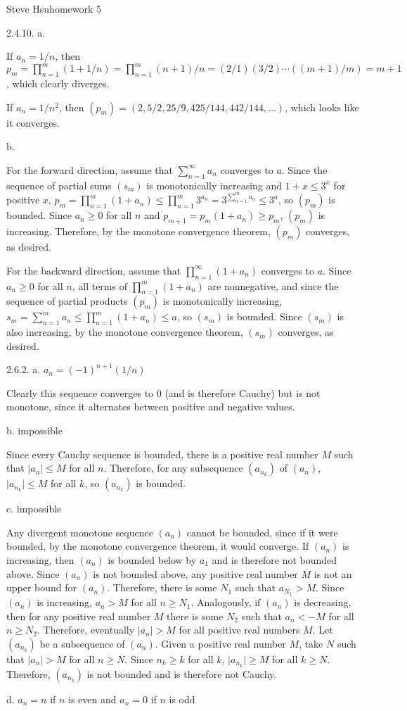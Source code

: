 \def\abs#1{\vert{#1}\vert}
\centerline{Steve Hsu\hfill homework 5}
\item{2.4.10.} a.

If $a_n = 1/n$, then
$p_m = \prod _{n=1} ^m (1 + 1/n) = \prod _{n=1} ^m (n+1)/n =
(2/1)(3/2)\cdots((m+1)/m) = m+1$, which clearly diverges.

If $a_n = 1/n^2$, then
$(p_m) = (2, 5/2, 25/9, 425/144, 442/144, \ldots)$,
which looks like it converges.
\medskip
\item{} b.

For the forward direction, assume that
$\sum _{n=1} ^\infty a_n$ converges to $a$.
Since the sequence of partial sums $(s_m)$ is monotonically increasing
and $1 + x \le 3^x$ for positive $x$,
$p_m = \prod _{n=1} ^m (1+a_n) \le \prod _{n=1} ^m 3^{a_n} =
3 ^{\sum _{n=1} ^m a_n} \le 3 ^a$, so $(p_m)$ is bounded.
Since $a_n \ge 0$ for all $n$ and $p_{m+1} = p_m (1 + a_n) \ge p_m$,
$(p_m)$ is increasing.
Therefore, by the monotone convergence theorem, $(p_m)$ converges, as desired.

For the backward direction, assume that
$\prod _{n=1} ^\infty (1+a_n)$ converges to $a$.
Since $a_n \ge 0$ for all $n$,
all terms of $\prod _{n=1} ^m (1 + a_n)$ are nonnegative,
and since the sequence of partial products $(p_m)$ is monotonically increasing,
$s_m = \sum _{n=1} ^m a_n \le \prod _{n=1} ^m (1+a_n) \le a$,
so $(s_m)$ is bounded.
Since $(s_m)$ is also increasing, by the monotone convergence theorem,
$(s_m)$ converges, as desired.
\bigskip
\item{2.6.2.} a. $a_n = (-1)^{n+1} (1/n)$

Clearly this sequence converges to $0$ (and is therefore Cauchy)
but is not monotone, since it alternates between positive and negative values.
\medskip
\item{} b. impossible

Since every Cauchy sequence is bounded,
there is a positive real number $M$ such that
$\abs{a_n} \le M$ for all $n$.
Therefore, for any subsequence $(a_{n_k})$ of $(a_n)$,
$\abs{a_{n_k}} \le M$ for all $k$, so $(a_{n_k})$ is bounded.
\medskip
\item{} c. impossible

Any divergent monotone sequence $(a_n)$ cannot be bounded, since
if it were bounded, by the monotone convergence theorem, it would converge.
If $(a_n)$ is increasing, then $(a_n)$ is bounded below by $a_1$
and is therefore not bounded above.
Since $(a_n)$ is not bounded above,
any positive real number $M$ is not an upper bound for $(a_n)$.
Therefore, there is some $N_1$ such that $a_{N_1} > M$.
Since $(a_n)$ is increasing, $a_n > M$ for all $n \ge N_1$.
Analogously, if $(a_n)$ is decreasing,
then for any positive real number $M$
there is some $N_2$ such that $a_n < -M$ for all $n \ge N_2$.
Therefore, eventually $\abs{a_n} > M$ for all positive real numbers $M$.
Let $(a_{n_k})$ be a subsequence of $(a_n)$.
Given a positive real number $M$, take $N$
such that $\abs{a_n} > M$ for all $n \ge N$.
Since $n_k \ge k$ for all $k$, $\abs{a_{n_k}} \ge M$ for all $k \ge N$.
Therefore, $(a_{n_k})$ is not bounded and is therefore not Cauchy.
\medskip
\item{} d. $a_n = n$ if $n$ is even and $a_n = 0$ if $n$ is odd

